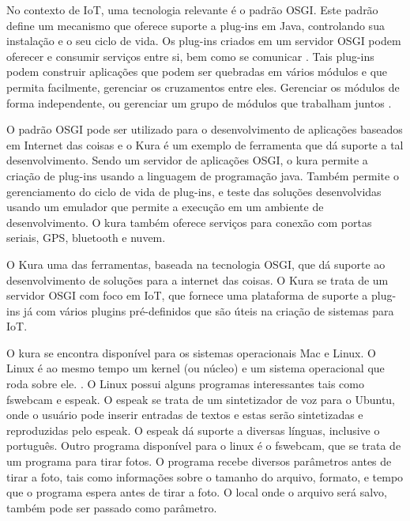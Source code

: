 No contexto de IoT, uma tecnologia relevante é o padrão OSGI. Este padrão define um mecanismo que oferece suporte a plug-ins em Java, controlando sua instalação e o seu ciclo de vida. Os plug-ins criados em um servidor OSGI podem oferecer e consumir serviços entre si, bem como se comunicar \cite{IntroducaoOsgi}. Tais plug-ins podem construir aplicações que podem ser quebradas em vários módulos e que permita facilmente, gerenciar os cruzamentos entre eles. Gerenciar os módulos de forma independente, ou gerenciar um grupo de módulos que trabalham juntos \cite{OsgiVantagens}.

O padrão OSGI pode ser utilizado para o desenvolvimento de aplicações baseados em Internet das coisas e o Kura é um exemplo de ferramenta que dá suporte a tal desenvolvimento. Sendo um servidor de aplicações OSGI, o kura permite a criação de plug-ins usando a linguagem de programação java. Também permite o gerenciamento do ciclo de vida de plug-ins, e teste das soluções desenvolvidas usando um emulador que permite a execução em um ambiente de desenvolvimento. O kura também oferece serviços para conexão com portas seriais, GPS, bluetooth e nuvem.

O Kura uma das ferramentas, baseada na tecnologia OSGI, que dá suporte ao desenvolvimento de soluções para a internet das coisas. O Kura se trata de um servidor OSGI com foco em IoT, que fornece uma plataforma de suporte a plug-ins já com vários plugins pré-definidos que são úteis na criação de sistemas para IoT.

O kura se encontra disponível para os sistemas operacionais Mac e Linux. O Linux é ao mesmo tempo um kernel (ou núcleo) e um sistema operacional que roda sobre ele. \cite{campos2006linux}. O Linux possui alguns programas interessantes tais como fswebcam e espeak. O espeak se trata de um sintetizador de voz para o Ubuntu, onde o usuário pode inserir entradas de textos e estas serão sintetizadas e reproduzidas pelo espeak. O espeak dá suporte a diversas línguas, inclusive o português. Outro programa disponível para o linux é o fswebcam, que se trata de um programa para tirar fotos. O programa recebe diversos parâmetros antes de tirar a foto, tais como informações sobre o tamanho do arquivo, formato, e tempo que o programa espera antes de tirar a foto. O local onde o arquivo será salvo, também pode ser passado como parâmetro.


